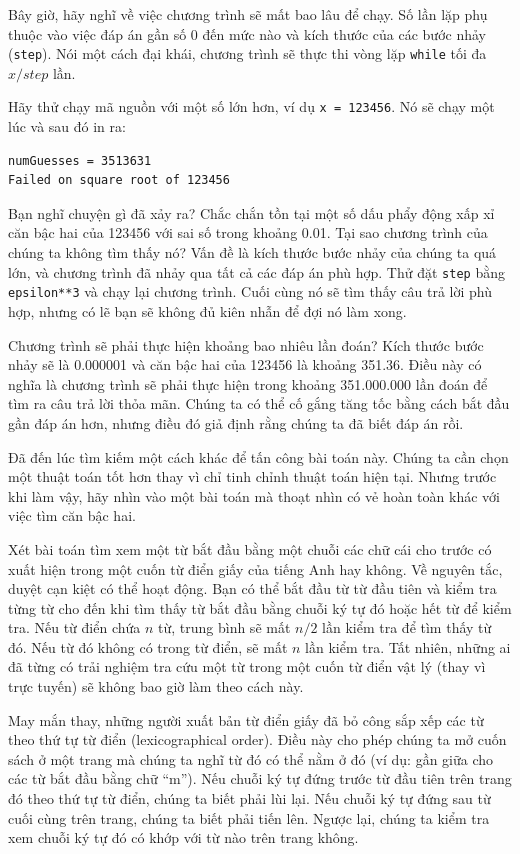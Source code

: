Bây giờ, hãy nghĩ về việc chương trình sẽ mất bao lâu để chạy. Số lần lặp phụ thuộc vào việc đáp án gần số 0 đến mức nào và kích thước của các bước nhảy (\texttt{step}). Nói một cách đại khái, chương trình sẽ thực thi vòng lặp \texttt{while} tối đa $x/step$ lần.

Hãy thử chạy mã nguồn với một số lớn hơn, ví dụ \texttt{x = 123456}. Nó sẽ chạy một lúc và sau đó in ra:

\begin{verbatim}
numGuesses = 3513631
Failed on square root of 123456
\end{verbatim}

Bạn nghĩ chuyện gì đã xảy ra? Chắc chắn tồn tại một số dấu phẩy động xấp xỉ căn bậc hai của 123456 với sai số trong khoảng 0.01. Tại sao chương trình của chúng ta không tìm thấy nó? Vấn đề là kích thước bước nhảy của chúng ta quá lớn, và chương trình đã nhảy qua tất cả các đáp án phù hợp. Thử đặt \texttt{step} bằng \texttt{epsilon**3} và chạy lại chương trình. Cuối cùng nó sẽ tìm thấy câu trả lời phù hợp, nhưng có lẽ bạn sẽ không đủ kiên nhẫn để đợi nó làm xong.

Chương trình sẽ phải thực hiện khoảng bao nhiêu lần đoán? Kích thước bước nhảy sẽ là 0.000001 và căn bậc hai của 123456 là khoảng 351.36. Điều này có nghĩa là chương trình sẽ phải thực hiện trong khoảng 351.000.000 lần đoán để tìm ra câu trả lời thỏa mãn. Chúng ta có thể cố gắng tăng tốc bằng cách bắt đầu gần đáp án hơn, nhưng điều đó giả định rằng chúng ta đã biết đáp án rồi.

Đã đến lúc tìm kiếm một cách khác để tấn công bài toán này. Chúng ta cần chọn một thuật toán tốt hơn thay vì chỉ tinh chỉnh thuật toán hiện tại. Nhưng trước khi làm vậy, hãy nhìn vào một bài toán mà thoạt nhìn có vẻ hoàn toàn khác với việc tìm căn bậc hai.

Xét bài toán tìm xem một từ bắt đầu bằng một chuỗi các chữ cái cho trước có xuất hiện trong một cuốn từ điển giấy của tiếng Anh hay không. Về nguyên tắc, duyệt cạn kiệt có thể hoạt động. Bạn có thể bắt đầu từ từ đầu tiên và kiểm tra từng từ cho đến khi tìm thấy từ bắt đầu bằng chuỗi ký tự đó hoặc hết từ để kiểm tra. Nếu từ điển chứa $n$ từ, trung bình sẽ mất $n/2$ lần kiểm tra để tìm thấy từ đó. Nếu từ đó không có trong từ điển, sẽ mất $n$ lần kiểm tra. Tất nhiên, những ai đã từng có trải nghiệm tra cứu một từ trong một cuốn từ điển vật lý (thay vì trực tuyến) sẽ không bao giờ làm theo cách này.

May mắn thay, những người xuất bản từ điển giấy đã bỏ công sắp xếp các từ theo thứ tự từ điển (lexicographical order). Điều này cho phép chúng ta mở cuốn sách ở một trang mà chúng ta nghĩ từ đó có thể nằm ở đó (ví dụ: gần giữa cho các từ bắt đầu bằng chữ ``m''). Nếu chuỗi ký tự đứng trước từ đầu tiên trên trang đó theo thứ tự từ điển, chúng ta biết phải lùi lại. Nếu chuỗi ký tự đứng sau từ cuối cùng trên trang, chúng ta biết phải tiến lên. Ngược lại, chúng ta kiểm tra xem chuỗi ký tự đó có khớp với từ nào trên trang không.

